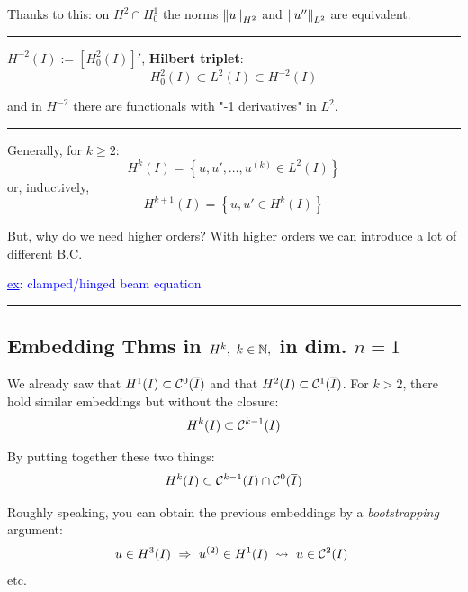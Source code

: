 Thanks to this: on $H^2\cap H^1_0$ the norms $\left\lVert u \right\rVert_{H^2}$ and $\left\lVert u'' \right\rVert_{L^2}$ are equivalent.

\rule{0.31\textwidth}{0.2pt}
\smallskip

$H^{-2}(I):=\left[ H^2_0(I) \right]'$, \textbf{Hilbert triplet}:
\begin{equation*}
H_0^2(I)\subset L^2(I) \subset H^{-2}(I)
\end{equation*}

and in $H^{-2}$ there are functionals with "-1 derivatives" in $L^2$.

\rule{0.31\textwidth}{0.2pt}
\smallskip

Generally, for $k\geq 2$:
\begin{equation*}
H^k(I)=\left\{ u,u',\dots,u^{(k)}\in L^2(I) \right\}
\end{equation*}
or, inductively,
\begin{equation*}
H^{k+1}(I)=\left\{ u,u'\in H^{k}(I) \right\}
\end{equation*}

But, why do we need higher orders? With higher orders we can introduce a lot of different B.C.

\textcolor{blue}{\underline{ex}: clamped/hinged beam equation}

\rule{0.31\textwidth}{0.2pt}


\subsection{\texorpdfstring{\color{red}Embedding Thms in \texorpdfstring{$H^k,\ k\in\mathbb{N},$}{C} in dim. \texorpdfstring{$n=1$}{C}}{}}


We already saw that $H^1(I)\subset \mathcal{C}^0(\overline{I})$ and that $H^2(I)\subset \mathcal{C}^1(\overline{I})$. For $k>2$, there hold similar embeddings but without the closure:
\begin{equation*}
H^k(I)\subset \mathcal{C}^{k-1}(I)
\end{equation*}

By putting together these two things:
\begin{equation*}
H^k(I)\subset \mathcal{C}^{k-1}(I)\cap\mathcal{C}^0(\overline{I})
\end{equation*}

Roughly speaking, you can obtain the previous embeddings by a \emph{bootstrapping} argument:
\begin{equation*}
u\in H^3(I)\ \Rightarrow \ u^{(2)}\in H^1(I) \ \leadsto \ u\in\Cc^2(I)\ 
\end{equation*}
etc.

